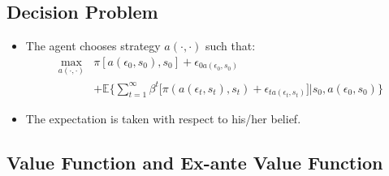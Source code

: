 \documentclass[
]{book}
\providecommand{\tightlist}{%
  \setlength{\itemsep}{0pt}\setlength{\parskip}{0pt}}
\begin{document}
\hypertarget{decision-problem}{%
\subsection{Decision Problem}\label{decision-problem}}

\begin{itemize}
\tightlist
\item
  The agent chooses strategy \(a(\cdot, \cdot)\) such that:
  \begin{equation}
  \begin{split}
  \max_{a(\cdot, \cdot)} & \pi[a(\epsilon_0, s_0), s_0] + \epsilon_{0 a(\epsilon_0, s_0)}\\
  &+ \mathbb{E}\Bigg\{ \sum_{t = 1}^\infty \beta^t \Bigg[\pi(a(\epsilon_t, s_t), s_t) + \epsilon_{t a(\epsilon_t, s_t)}\Bigg]\Bigg|s_0, a(\epsilon_0, s_0)\Bigg\}
  \end{split}
  \end{equation}
\item
  The expectation is taken with respect to his/her belief.
\end{itemize}

\hypertarget{value-function-and-ex-ante-value-function}{%
\subsection{Value Function and Ex-ante Value Function}\label{value-function-and-ex-ante-value-function}}
\end{document}
